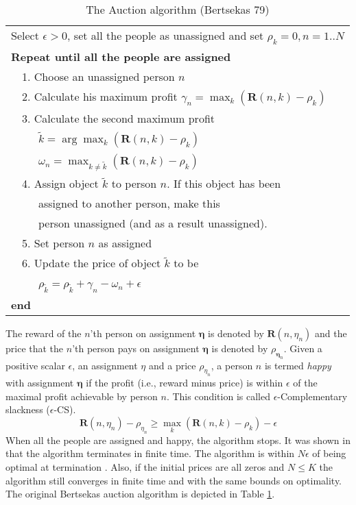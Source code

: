 \documentclass[11pt,onecolumn]{article}
\newcommand{\beq}{\begin{equation}}
\newcommand{\eeq}{\end{equation}}
\begin{document}
\begin{table}
\caption{The Auction algorithm (Bertsekas 79)}
\label{table_auction_alg}
\begin{tabular}{l}
\hline
Select $\epsilon>0$, set all the people as unassigned and set $\rho_k=0,n=1..N$\\
\textbf{Repeat until all the people are assigned}\\
\ \ 1. Choose an unassigned person $n$\\
\ \ 2. Calculate his maximum profit $\gamma_{n}=\max_k(\textbf{R}(n,k)-\rho_k)$ \\
\ \ 3. Calculate the second maximum profit\\
\ \ \ \ \ $\tilde{k}=\arg\max_k(\textbf{R}(n,k)-\rho_k)$\\
\ \ \ \ \ $\omega_{n}=\max_{k\neq \tilde{k}}(\textbf{R}(n,k)-\rho_k)$\\
\ \ 4. Assign object $\tilde{k}$ to person $n$. If this object has been\\
\ \ \ \ \ assigned to another person, make this \\
\ \ \ \ \ person unassigned (and as a result unassigned).\\
\ \ 5. Set person $n$ as assigned\\
\ \ 6. Update the price of object $\tilde{k}$ to be \\
\ \ \ \ \ $\rho_{\tilde{k}}=\rho_{\tilde{k}}+\gamma_{n}-\omega_{n}+\epsilon$\\
\textbf{end} \\
\hline
\end{tabular}
\end{table}
The reward of the $n$'th person on assignment $\boldsymbol\eta$ is denoted by $\textbf{R}(n,\eta_n)$
and the price that the $n$'th person pays on assignment $\boldsymbol\eta$ is denoted by
$\rho_{\boldsymbol\eta_{n}}$.
Given a positive scalar $\epsilon$, an assignment $\eta$ and a price $\rho_{\eta_n}$, a person $n$ is termed \emph{happy} with assignment $\boldsymbol\eta$ if the profit (i.e., reward minus price) is within $\epsilon$ of the maximal profit achievable by person $n$. This condition is called $\epsilon$-Complementary slackness ($\epsilon$-CS).
\beq\label{eq_ecs}
\textbf{R}(n,\eta_n)-\rho_{\eta_n}\geq\max_k(\textbf{R}(n,k)-\rho_k)-\epsilon
\eeq
When all the people are assigned and happy, the algorithm stops. It was shown in \cite{bertsekas1979distributed} that the algorithm terminates in finite time. The algorithm is within $N\epsilon$ of being optimal at termination \cite{bertsekas1979distributed}. Also, if the initial prices are all zeros and $N\leq K$ the algorithm still converges in finite time and with the same bounds on optimality. The original Bertsekas auction algorithm is depicted in Table \ref{table_auction_alg}.
\end{document}
